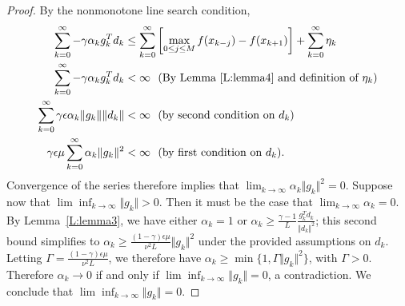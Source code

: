 \documentclass[]{interact}
\theoremstyle{plain}%
\theoremstyle{definition}
\theoremstyle{remark}
\begin{document}
\begin{proof} By the nonmonotone line search condition,
\begin{align*}
\sum_{k=0}^\infty -\gamma \alpha_k g_k^T d_k &\leq \sum_{k=0}^\infty\left[  \max_{0 \leq j \leq M} f(x_{k-j}) - f(x_{k+1})\right] + \sum_{k=0}^\infty \eta_k \\
\sum_{k=0}^\infty -\gamma \alpha_k g_k^T d_k&< \infty~~\text{(By Lemma~\ref{L:lemma4} and definition of $\eta_k$)}\\
\sum_{k=0}^\infty \gamma \epsilon \alpha_k \Vert g_k \Vert \Vert d_k \Vert &< \infty~~\text{(by second condition on $d_k$)}\\
\gamma \epsilon \mu \sum_{k=0}^\infty \alpha_k \Vert g_k \Vert^2 &< \infty~~\text{(by first condition on $d_k$)}.
\end{align*}
Convergence of the series therefore implies that $\displaystyle \lim_{k \to \infty} \alpha_k \Vert g_k \Vert^2 = 0$. Suppose now that $\displaystyle \lim \inf_{k \to \infty} \Vert g_k \Vert > 0$. Then it must be the case that $\displaystyle \lim_{k \to \infty} \alpha_k = 0$. By Lemma~\ref{L:lemma3}, we have either $\alpha_k = 1$ or $\displaystyle \alpha_k \geq \frac{\gamma-1}{L} \frac{g_k^T d_k}{\Vert d_k \Vert^2}$; this second bound simplifies to  $\displaystyle \alpha_k \geq \frac{(1-\gamma) \epsilon \mu}{\nu^2 L}\Vert g_k \Vert^2$ under the provided assumptions on $d_k$. Letting $\displaystyle \Gamma = \frac{(1-\gamma) \epsilon \mu}{\nu^2 L}$, we therefore have $\alpha_k \geq \min \{1, \Gamma \Vert g_k \Vert^2 \}$, with $\Gamma > 0$. Therefore $\alpha_k \to 0$ if and only if $\displaystyle \lim \inf_{k \to \infty} \Vert g_k \Vert = 0$, a contradiction. We conclude that $ \displaystyle \lim \inf_{k \to \infty} \Vert g_k \Vert = 0$.
\end{proof}
\end{document}
